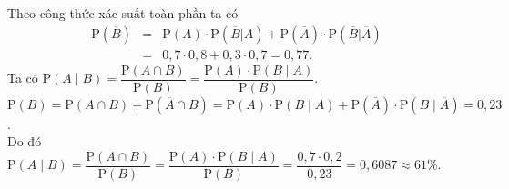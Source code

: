 \begin{ex}
{\begin{itemchoice}
\itemch Theo công thức xác suất toàn phần ta có
\begin{eqnarray*}
\mathrm{P}(\overline{B}) &=& \mathrm{P}(A) \cdot \mathrm{P}(\overline{B}|A) +\mathrm{P}\left(\overline{A}\right) \cdot  \mathrm{P}\left(\overline{B}|\overline{A}\right)\\
&=& 0{,}7 \cdot 0{,}8+ 0{,}3\cdot 0{,}7= 0{,}77.
\end{eqnarray*}
\itemch Ta có $ \mathrm{P}(A\mid B)=\dfrac{ \mathrm{P}(A \cap B)}{ \mathrm{P}(B)}=\dfrac{ \mathrm{P}(A)\cdot  \mathrm{P}(B \mid A)}{ \mathrm{P}(B)}$.\\
$ \mathrm{P}(B)=\mathrm{P}(A \cap B)+\mathrm{P}(\overline{A} \cap B)=\mathrm{P}(A)\cdot\mathrm{P}(B\mid A)+\mathrm{P}(\overline{A})\cdot\mathrm{P}(B\mid \overline{A})=0{,}23$.\\
Do đó $ \mathrm{P}(A\mid B)=\dfrac{ \mathrm{P}(A \cap B)}{ \mathrm{P}(B)}=\dfrac{ \mathrm{P}(A)\cdot  \mathrm{P}(B \mid A)}{ \mathrm{P}(B)}=\dfrac{0{,}7 \cdot 0{,}2}{0{,}23}=0{,}6087\approx 61\%$.
\end{itemchoice}
}
\end{ex}

